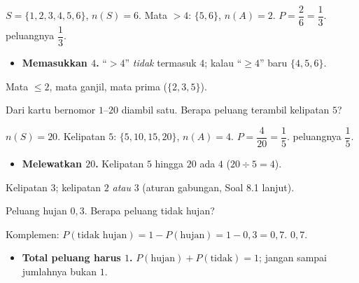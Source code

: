 \jawab
{} $S=\{1,2,3,4,5,6\}$, $n(S)=6$.
 Mata $>4$: $\{5,6\}$, $n(A)=2$.
 $P=\dfrac{2}{6}=\dfrac13$.
\jadi peluangnya $\dfrac13$.

\begin{jebakan}
\begin{itemize}[leftmargin=*,topsep=2pt]
  \item \textbf{Memasukkan $4$.} ``$>4$'' \emph{tidak} termasuk $4$; kalau
  ``$\ge4$'' baru $\{4,5,6\}$.
\end{itemize}
\end{jebakan}

\begin{variasi}
Mata $\le2$, mata ganjil, mata prima ($\{2,3,5\}$).
\end{variasi}

\begin{soalbox}{}
Dari kartu bernomor $1$--$20$ diambil satu. Berapa peluang terambil kelipatan
$5$?
\end{soalbox}

\jawab
{} $n(S)=20$.
 Kelipatan $5$: $\{5,10,15,20\}$, $n(A)=4$.
 $P=\dfrac{4}{20}=\dfrac15$.
\jadi peluangnya $\dfrac15$.

\begin{jebakan}
\begin{itemize}[leftmargin=*,topsep=2pt]
  \item \textbf{Melewatkan $20$.} Kelipatan $5$ hingga $20$ ada $4$
  ($20\div5=4$).
\end{itemize}
\end{jebakan}

\begin{variasi}
Kelipatan $3$; kelipatan $2$ \emph{atau} $3$ (aturan gabungan, Soal 8.1 lanjut).
\end{variasi}

\begin{soalbox}{}
Peluang hujan $0{,}3$. Berapa peluang tidak hujan?
\end{soalbox}

\jawab
{} Komplemen: $P(\text{tidak hujan})=1-P(\text{hujan})=1-0{,}3=0{,}7$.
\jadi $0{,}7$.

\begin{jebakan}
\begin{itemize}[leftmargin=*,topsep=2pt]
  \item \textbf{Total peluang harus $1$.} $P(\text{hujan})+P(\text{tidak})=1$;
  jangan sampai jumlahnya bukan $1$.
\end{itemize}
\end{jebakan}

